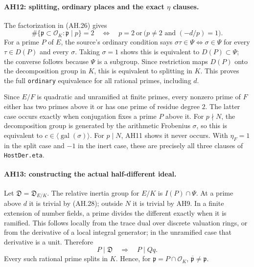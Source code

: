 \paragraph{AH12: splitting, ordinary places and the exact $\eta$ clauses.}
The factorization in (AH.26) gives
\[
 \#\{\mathfrak p\subset\mathcal O_K:\mathfrak p\mid p\}=2
 \quad\Longleftrightarrow\quad
 p=2\ \text{or}\ \bigl(p\ne2\text{ and }(-d/p)=1\bigr).        \tag{AH.30}
\]
For a prime $P$ of $E$, the source's ordinary condition says
$\sigma\tau\in\Psi\Longleftrightarrow\sigma\in\Psi$ for every
$\tau\in D(P)$ and every $\sigma$. Taking $\sigma=1$ shows this is
equivalent to $D(P)\subset\Psi$; the converse follows because $\Psi$ is
a subgroup. Since restriction maps $D(P)$ onto the decomposition group
in $K$, this is equivalent to splitting in $K$. This proves the full
\texttt{ordinary} equivalence for all rational primes, including $d$.

Since $E/F$ is quadratic and unramified at finite primes, every nonzero
prime of $F$ either has two primes above it or has one prime of residue
degree $2$. The latter case occurs exactly when conjugation fixes a prime
$P$ above it. For $p\nmid N$, the decomposition group is generated by
the arithmetic Frobenius $\sigma$, so this is equivalent to
$c\in\langle\operatorname{gal}(\sigma)\rangle$.
For $p\mid N$, AH11 shows it never occurs. With $\eta_F=1$ in the split
case and $-1$ in the inert case, these are precisely all three clauses of
\texttt{HostDer.eta}.

\paragraph{AH13: constructing the actual half-different ideal.}
Let $\mathfrak D=\mathfrak D_{E/K}$.
The relative inertia group for $E/K$ is $I(P)\cap\Psi$. At a prime above
$d$ it is trivial by (AH.28); outside $N$ it is trivial by AH9.
In a finite extension of number fields, a prime divides the different
exactly when it is ramified. This follows locally from the trace dual
over discrete valuation rings, or from the derivative of a local integral
generator; in the unramified case that derivative is a unit.
Therefore
\[
 P\mid\mathfrak D\quad\Longrightarrow\quad P\mid Qq.           \tag{AH.31}
\]
Every such rational prime splits in $K$. Hence, for
$\mathfrak p=P\cap\mathcal O_K$,
$\overline{\mathfrak p}\ne\mathfrak p$.

